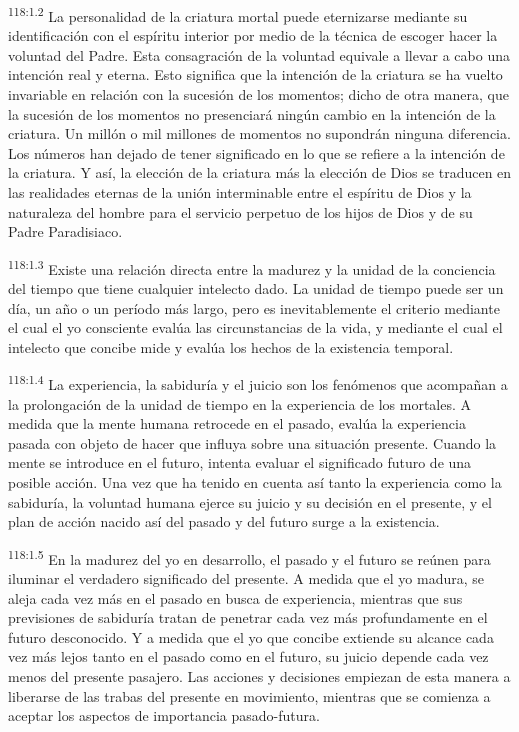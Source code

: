 \documentclass[twoside, 11pt]{book}
\begin{document}
\par
\textsuperscript{118:1.2} La personalidad de la criatura mortal puede eternizarse mediante su identificación con el espíritu interior por medio de la técnica de escoger hacer la voluntad del Padre. Esta consagración de la voluntad equivale a llevar a cabo una intención real y eterna. Esto significa que la intención de la criatura se ha vuelto invariable en relación con la sucesión de los momentos; dicho de otra manera, que la sucesión de los momentos no presenciará ningún cambio en la intención de la criatura. Un millón o mil millones de momentos no supondrán ninguna diferencia. Los números han dejado de tener significado en lo que se refiere a la intención de la criatura. Y así, la elección de la criatura más la elección de Dios se traducen en las realidades eternas de la unión interminable entre el espíritu de Dios y la naturaleza del hombre para el servicio perpetuo de los hijos de Dios y de su Padre Paradisiaco.

\par
\textsuperscript{118:1.3} Existe una relación directa entre la madurez y la unidad de la conciencia del tiempo que tiene cualquier intelecto dado. La unidad de tiempo puede ser un día, un año o un período más largo, pero es inevitablemente el criterio mediante el cual el yo consciente evalúa las circunstancias de la vida, y mediante el cual el intelecto que concibe mide y evalúa los hechos de la existencia temporal.

\par
\textsuperscript{118:1.4} La experiencia, la sabiduría y el juicio son los fenómenos que acompañan a la prolongación de la unidad de tiempo en la experiencia de los mortales. A medida que la mente humana retrocede en el pasado, evalúa la experiencia pasada con objeto de hacer que influya sobre una situación presente. Cuando la mente se introduce en el futuro, intenta evaluar el significado futuro de una posible acción. Una vez que ha tenido en cuenta así tanto la experiencia como la sabiduría, la voluntad humana ejerce su juicio y su decisión en el presente, y el plan de acción nacido así del pasado y del futuro surge a la existencia.

\par
\textsuperscript{118:1.5} En la madurez del yo en desarrollo, el pasado y el futuro se reúnen para iluminar el verdadero significado del presente. A medida que el yo madura, se aleja cada vez más en el pasado en busca de experiencia, mientras que sus previsiones de sabiduría tratan de penetrar cada vez más profundamente en el futuro desconocido. Y a medida que el yo que concibe extiende su alcance cada vez más lejos tanto en el pasado como en el futuro, su juicio depende cada vez menos del presente pasajero. Las acciones y decisiones empiezan de esta manera a liberarse de las trabas del presente en movimiento, mientras que se comienza a aceptar los aspectos de importancia pasado-futura.
\end{document}
